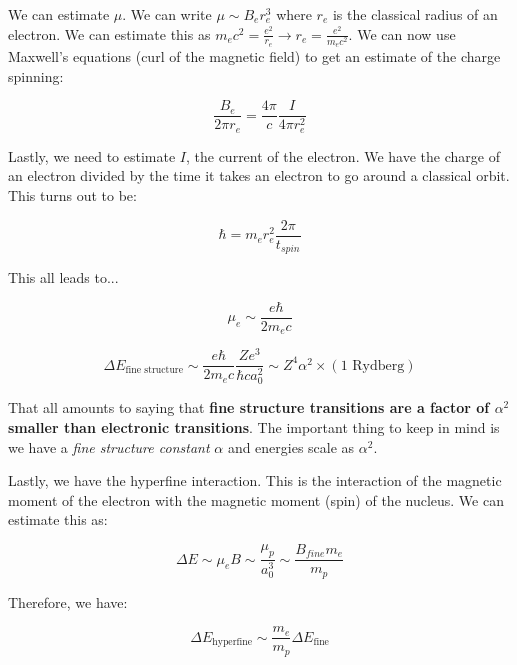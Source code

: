 \documentclass{article}
\begin{document}
We can estimate $\mu$. We can write $\mu \sim B_e r_e^3$ where $r_e$ is the classical radius of an electron. We can estimate this as $m_e c^2 = \frac{e^2}{r_e} \rightarrow r_e = \frac{e^2}{m_e c^2}$. We can now use Maxwell's equations (curl of the magnetic field) to get an estimate of the charge spinning:

\begin{equation}
    \frac{B_e}{2 \pi r_e} = \frac{4 \pi }{c}\frac{I}{4\pi r_e^2}
\end{equation}

Lastly, we need to estimate $I$, the current of the electron. We have the charge of an electron divided by the time it takes an electron to go around a classical orbit. This turns out to be:

\begin{equation}
    \hbar = m_e r_e^2 \frac{2\pi}{t_{spin}}
\end{equation}

This all leads to...

\begin{equation}
    \mu_e \sim \frac{e \hbar}{2 m_e c}
\end{equation}

\begin{equation}
    \boxed{\Delta E_\text{fine structure} \sim \frac{e \hbar}{2 m_e c} \frac{Z e^3}{\hbar c a_0^2} \sim Z^4 \alpha^2 \times \left(1 \text{ Rydberg}\right)}
\end{equation}

That all amounts to saying that \textbf{fine structure transitions are a factor of $\alpha^2$ smaller than electronic transitions}. The important thing to keep in mind is we have a \textit{fine structure constant} $\alpha$ and energies scale as $\alpha^2$. 

Lastly, we have the hyperfine interaction. This is the interaction of the magnetic moment of the electron with the magnetic moment (spin) of the nucleus. We can estimate this as:

\begin{equation}
    \Delta E \sim \mu_e B \sim \frac{\mu_p}{a_0^3} \sim \frac{B_{fine} m_e}{m_p}
\end{equation}

Therefore, we have:

\begin{equation}
    \boxed{\Delta E_{\text{hyperfine}} \sim \frac{m_e}{m_p}\Delta E_{\text{fine}}}
\end{equation}
\end{document}

